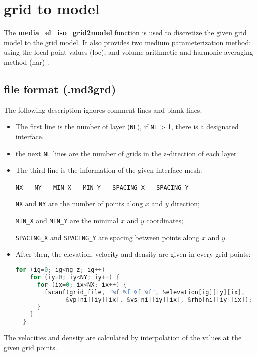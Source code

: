 \section{grid to model}
The \textbf{media\_el\_iso\_grid2model} function is used to discretize the given grid model to the grid model. It also provides two medium parameterization method: using the local point values (loc), and volume arithmetic and harmonic averaging method (har) \citep{moczo_3d_2002,moczo_finite-difference_2014}.

\subsection{file format (.md3grd)}
The following description ignores comment lines and blank lines.
\begin{itemize}
 \item The first line is the number of layer (\texttt{NL}), if \texttt{NL} > 1, there is a designated interface.
 \item the next \texttt{NL} lines are the number of grids in the z-direction of each layer 
 \item {The third line is the information of the given interface mesh:
  
  \texttt{NX} ~~ \texttt{NY} ~~ \texttt{MIN\_X} ~~ \texttt{MIN\_Y} ~~ \texttt{SPACING\_X} ~~ \texttt{SPACING\_Y}

  \texttt{NX} and \texttt{NY} are the number of points along $x$ and $y$ direction;

  \texttt{MIN\_X} and \texttt{MIN\_Y} are the minimal $x$ and $y$ coordinates;

  \texttt{SPACING\_X} and \texttt{SPACING\_Y} are spacing between points along $x$ and $y$.
 }
 \item {
  After then, the elevation, velocity and density are given in every grid points:
  \begin{lstlisting}[language = C]
  for (ig=0; ig<ng_z; ig++)
    for (iy=0; iy<NY; iy++) {
      for (ix=0; ix<NX; ix++) { 
        fscanf(grid_file, "%f %f %f %f", &elevation[ig][iy][ix], 
              &vp[ni][iy][ix], &vs[ni][iy][ix], &rho[ni][iy][ix]);
      }
    }
  }
  \end{lstlisting}
 } 
\end{itemize}
The velocities and density are calculated by interpolation of the values at the given grid points.

